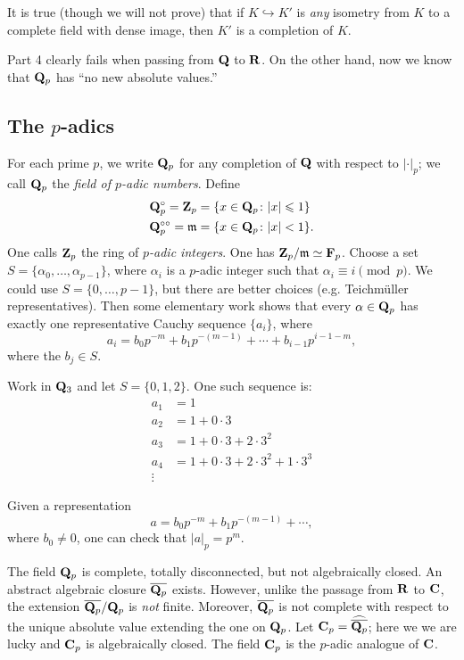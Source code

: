 It is true (though we will not prove) that if $K\hookrightarrow K'$ is 
\emph{any} isometry from $K$ to a complete field with dense image, then $K'$ is 
a completion of $K$. 

Part 4 clearly fails when passing from $\mathbf{Q}$ to $\mathbf{R}$. On the other hand, now 
we know that $\mathbf{Q}_p$ has ``no new absolute values.'' 





\subsection{The \texorpdfstring{$p$}{p}-adics}

For each prime $p$, we write $\mathbf{Q}_p$ for any completion of $\mathbf{Q}$ with respect 
to $|\cdot|_p$; we call $\mathbf{Q}_p$ the \emph{field of $p$-adic numbers}. Define 
\begin{align*}
  \mathbf{Q}_p^\circ = \mathbf{Z}_p &= \{x\in \mathbf{Q}_p\colon |x|\leqslant 1\} \\
  \mathbf{Q}_p^{\circ\circ} = \mathfrak{m} &= \{x\in \mathbf{Q}_p\colon |x|<1\} .
\end{align*}
One calls $\mathbf{Z}_p$ the ring of \emph{$p$-adic integers}. One has 
$\mathbf{Z}_p/\mathfrak{m}\simeq \mathbf{F}_p$. Choose a 
set $S=\{\alpha_0,\dots,\alpha_{p-1}\}$, where $\alpha_i$ is a $p$-adic integer 
such that $\alpha_i\equiv i\pmod p$. We could use $S=\{0,\dots,p-1\}$, but 
there are better choices (e.g. Teichm\"uller representatives). Then some 
elementary work shows that every $\alpha\in \mathbf{Q}_p$ has exactly one 
representative Cauchy sequence $\{a_i\}$, where 
\[
  a_i = b_0 p^{-m} + b_1 p^{-(m-1)} + \cdots + b_{i-1} p^{i-1-m} ,
\]
where the $b_j\in S$. 

\begin{example}
Work in $\mathbf{Q}_3$ and let $S=\{0,1,2\}$. One such sequence is: 
\begin{align*}
  a_1 &= 1 \\
  a_2 &= 1+0\cdot 3 \\
  a_3 &= 1+0\cdot 3+2\cdot 3^2 \\
  a_4 &= 1+0\cdot 3+2\cdot 3^2 + 1\cdot 3^3 \\
  \vdots &
\end{align*}
\end{example}

Given a representation 
\[
  a = b_0 p^{-m} + b_1 p^{-(m-1)} + \cdots ,
\]
where $b_0\ne 0$, one can check that $|a|_p = p^m$. 

The field $\mathbf{Q}_p$ is complete, totally disconnected, but not algebraically 
closed. An abstract algebraic closure $\overline{\mathbf{Q}_p}$ exists. However, 
unlike the passage from $\mathbf{R}$ to $\mathbf{C}$, the extension $\overline{\mathbf{Q}_p}/\mathbf{Q}_p$ 
is \emph{not} finite. Moreover, $\overline{\mathbf{Q}_p}$ is not complete with respect 
to the unique absolute value extending the one on $\mathbf{Q}_p$. Let 
$\mathbf{C}_p=\widehat{\overline{\mathbf{Q}_p}}$; here we we are lucky and $\mathbf{C}_p$ is 
algebraically closed. The field $\mathbf{C}_p$ is the $p$-adic analogue of $\mathbf{C}$. 





